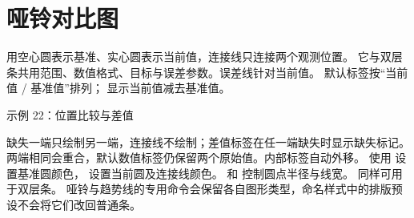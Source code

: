 \section{哑铃对比图}
 用空心圆表示基准、实心圆表示当前值，连接线只连接两个观测位置。
它与双层条共用范围、数值格式、目标与误差参数。误差线针对当前值。
默认标签按“当前值 / 基准值”排列； 显示当前值减去基准值。
\begin{example}[text and listing,sidebyside=false]{示例 22：位置比较与差值}


\end{example}
缺失一端只绘制另一端，连接线不绘制；差值标签在任一端缺失时显示缺失标记。
两端相同会重合，默认数值标签仍保留两个原始值。内部标签自动外移。
使用  设置基准圆颜色， 设置当前圆及连接线颜色。
 和  控制圆点半径与线宽。
 同样可用于双层条。
哑铃与趋势线的专用命令会保留各自图形类型，命名样式中的排版预设不会将它们改回普通条。
